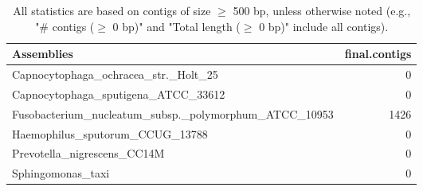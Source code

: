 \documentclass[12pt,a4paper]{article}
\begin{document}
\begin{table}[ht]
\begin{center}
\caption{All statistics are based on contigs of size $\geq$ 500 bp, unless otherwise noted (e.g., "\# contigs ($\geq$ 0 bp)" and "Total length ($\geq$ 0 bp)" include all contigs).}
\begin{tabular}{|l*{1}{|r}|}
\hline
Assemblies & final.contigs \\ \hline
Capnocytophaga\_ochracea\_str.\_Holt\_25 & 0 \\ \hline
Capnocytophaga\_sputigena\_ATCC\_33612 & 0 \\ \hline
Fusobacterium\_nucleatum\_subsp.\_polymorphum\_ATCC\_10953 & 1426 \\ \hline
Haemophilus\_sputorum\_CCUG\_13788 & 0 \\ \hline
Prevotella\_nigrescens\_CC14M & 0 \\ \hline
Sphingomonas\_taxi & 0 \\ \hline
\end{tabular}
\end{center}
\end{table}
\end{document}
